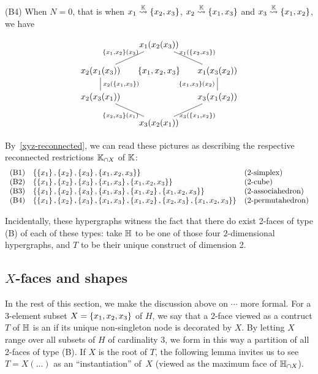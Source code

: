\smallskip\noindent
(B4) When $N=0$, that is when $x_1\stackrel{{\mathbb K}}{\rightsquigarrow}\left\{x_2,x_3\right\}$, $x_2\stackrel{{\mathbb K}}{\rightsquigarrow}\left\{x_1,x_3\right\}$ and
 $x_3\stackrel{{\mathbb K}}{\rightsquigarrow}\left\{x_1,x_2\right\}$, we have
 
 $$\xymatrix @-1.65pc {&& x_1(x_2(x_3)) \ar @{-}[ddll]_{\set{x_1,x_2}(x_3)} \ar @{-}[ddrr]^{x_1(\set{x_2,x_3})}&& \\
 &&&&\\
 x_2(x_1(x_3)) \ar @{-}[dd]^{x_2(\set{x_1,x_3})}&& \set{x_1,x_2,x_3} && x_1(x_3(x_2))\ar @{-}[dd]_{\set{x_1,x_3}(x_2)}\\
 &&  &&\\
 x_2(x_3(x_1)) \ar @{-}[ddrr]_{\set{x_2,x_3}(x_1)} &&  && \ar @{-}[ddll]^{x_3(\set{x_1,x_2})} x_3(x_1(x_2))\\
 &&&&\\
 &&  x_3(x_2(x_1))&&}
$$

By~\cref{xyz-reconnected}, we can read these pictures as describing the 
respective reconnected restrictions ${\mathbb K}_{\cap X}$ of ${\mathbb K}$:
$$\begin{array}{lll}
\mathrm{(B1)} & \left\{\left\{x_1\right\},\left\{x_2\right\},\left\{x_3\right\},\left\{x_1,x_2,x_3\right\}\right\} & \mbox{(2-simplex)}\\
\mathrm{(B2)} & \left\{\left\{x_1\right\},\left\{x_2\right\},\left\{x_3\right\},\left\{x_1,x_3\right\},\left\{x_1,x_2,x_3\right\}\right\} & \mbox{(2-cube})\\
\mathrm{(B3)} & \left\{\left\{x_1\right\},\left\{x_2\right\},\left\{x_3\right\},\left\{x_1,x_3\right\},\left\{x_1,x_2\right\},\left\{x_1,x_2,x_3\right\}\right\} & \mbox{(2-associahedron)}\\
\mathrm{(B4)} & \left\{\left\{x_1\right\},\left\{x_2\right\},\left\{x_3\right\},\left\{x_1,x_3\right\},\left\{x_1,x_2\right\},\left\{x_2,x_3\right\},\left\{x_1,x_2,x_3\right\}\right\} & \mbox{(2-permutahedron)}
\end{array}$$

Incidentally, these  hypergraphs witness the fact that there do exist 2-faces of type (B) of  each  of these types: take ${\mathbb H}$ to be one of those four $2$-dimensional hypergraphs, and $T$ to be their unique construct of dimension 2.


\subsection{$X$-faces and shapes}

In the rest of this section, we make the discussion above on $\cdots$ more formal.
For a 3-element subset $X=\left\{x_1,x_2,x_3\right\}$ of $H$, we say that a 2-face viewed as a contruct $T$ of ${\mathbb H}$ is an  if its unique non-singleton node is decorated by $X$.  By letting $X$ range over all subsets of $H$ of cardinality 3, we form in this way a partition of all 2-faces of type (B).
If $X$ is the root of $T$, the following  lemma invites us to see $T=X(\ldots)$ as an ``instantiation'' of~$X$ (viewed as the maximum face of ${\mathbb H}_{\cap X}$).

